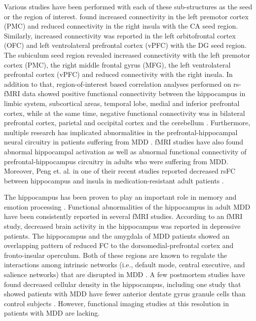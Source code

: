 \documentclass[12pt]{article}
\begin{document}
Various studies have been performed with each of these sub-structures
as the seed or the region of interest. \textcite{rightinsula} found
increased connectivity in the left premotor cortex (PMC) and reduced
connectivity in the right insula with the CA seed region. Similarly,
increased connectivity was reported in the left orbitofrontal cortex
(OFC) and left ventrolateral prefrontal cortex (vPFC) with the DG seed
region. The subiculum seed region revealed increased connectivity with
the left premotor cortex (PMC), the right middle frontal gyrus (MFG),
the left ventrolateral prefrontal cortex (vPFC) and reduced
connectivity with the right insula. In addition to that,
region-of-interest based correlation analyses performed on rs-fMRI
data showed positive functional connectivity between the hippocampus
in limbic system, subcortical areas, temporal lobe, medial and
inferior prefrontal cortex, while at the same time, negative
functional connectivity was in bilateral prefrontal cortex, parietal
and occipital cortex and the cerebellum
\cite{cerebellum}. Furthermore, multiple research has implicated
abnormalities in the prefrontal-hippocampal neural circuitry in
patients suffering from MDD \cite{prefrontal}. fMRI studies have also
found abnormal hippocampal activation as well as abnormal functional
connectivity of prefrontal-hippocampus circuitry in adults who were
suffering from MDD. Moreover, Peng et. al. in one of their recent
studies reported decreased rsFC between hippocampus and insula in
medication-resistant adult patients \cite{pengetal}.

The hippocampus has been proven to play an important role in memory
\cite{memory} and emotion processing \cite{emotion}. Functional
abnormalities of the hippocampus in adult MDD have been consistently
reported in several fMRI studies. According to an fMRI study,
decreased brain activity in the hippocampus was reported in depressive
patients. The hippocampus and the amygdala of MDD patients showed an
overlapping pattern of reduced FC to the dorsomedial-prefrontal cortex
and fronto-insular operculum. Both of these regions are known to
regulate the interactions among intrinsic networks (i.e., default
mode, central executive, and salience networks) that are disrupted in
MDD \cite{disruptedMDD}. A few postmortem studies have found decreased
cellular density in the hippocampus, including one study that showed
patients with MDD have fewer anterior dentate gyrus granule cells than
control subjects \cite{controlsubject}. However, functional imaging
studies at this resolution in patients with MDD are lacking.
\end{document}

